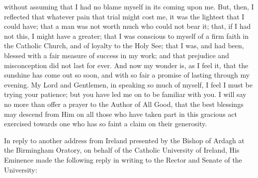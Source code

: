 without assuming that I had no blame myself in its coming upon me.
But, then, I reflected that whatever pain that trial might cost me, it
was the lightest that I could have; that a man was not worth much who
could not bear it; that, if I had not this, I might have a greater;
that I was conscious to myself of a firm faith in the Catholic Church,
and of loyalty to the Holy See; that I was, and had been, blessed with
a fair measure of success in my work; and that prejudice and
misconception did not last for ever. And now my wonder is, as I feel
it, that the sunshine has come out so soon, and with so fair a promise
of lasting through my evening. My Lord and Gentlemen, in speaking so
much of myself, I feel I must be trying your patience; but you have
led me on to be familiar with you. I will say no more than offer a
prayer to the Author of All Good, that the best blessings may descend
from Him on all those who have taken part in this gracious act
exercised towards one who has so faint a claim on their generosity.

In reply to another address from
Ireland presented by the Bishop of Ardagh at the Birmingham Oratory,
on behalf of the Catholic University of Ireland, His Eminence made the
following reply in writing to the Rector and Senate of the University:

